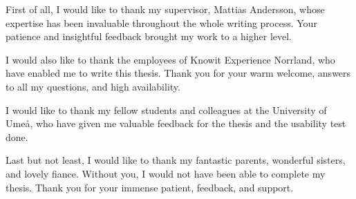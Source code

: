 First of all, I would like to thank my supervisor, Mattias Andersson, whose expertise has been invaluable throughout the whole writing process. Your patience and insightful feedback brought my work to a higher level.

I would also like to thank the employees of Knowit Experience Norrland, who have enabled me to write this thesis. Thank you for your warm welcome, answers to all my questions, and high availability.

I would like to thank my fellow students and colleagues at the University of Umeå, who have given me valuable feedback for the thesis and the usability test done.  

Last but not least, I would like to thank my fantastic parents, wonderful sisters, and lovely fiance. Without you, I would not have been able to complete my thesis. Thank you for your immense patient, feedback, and support.
\newpage
{}
